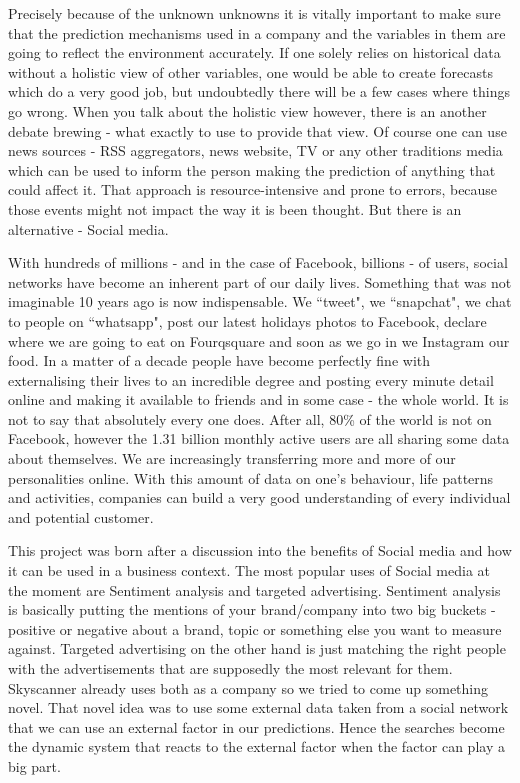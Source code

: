 \documentclass[minf,twoside,singlespacing,parskip,frontabs,notimes,12pt]{infthesis} %
\begin{document}
Precisely because of the unknown unknowns it is vitally important to make sure that the prediction mechanisms used in a company and the variables in them are going to reflect the environment accurately. 
If one solely relies on historical data without a holistic view of other variables, one would be able to create forecasts which do a very good job, but undoubtedly there will be a few cases where things go wrong. 
When you talk about the holistic view however, there is an another debate brewing - what exactly to use to provide that view. Of course one can use news sources - RSS aggregators, news website, TV or any other traditions media which can be used to inform the person making the prediction of anything that could affect it. 
That approach is resource-intensive and prone to errors, because those events might not impact the way it is been thought. But there is an alternative - Social media. 

With hundreds of millions - and in the case of Facebook, billions - of users, social networks have become an inherent part of our daily lives. Something that was not imaginable 10 years ago is now indispensable. 
We ``tweet", we ``snapchat", we chat to people on ``whatsapp", post our latest holidays photos to Facebook, declare where we are going to eat on Fourqsquare and soon as we go in we Instagram our food. 
In a matter of a decade people have become perfectly fine with externalising their lives to an incredible degree and posting every minute detail online and making it available to friends and in some case - the whole world. 
It is not to say that absolutely every one does. 
After all, 80\% of the world is not on Facebook\cite{FBstats}, however the 1.31 billion monthly active users are all sharing some data about themselves. 
We are increasingly transferring more and more of our personalities online.
 With this amount of data on one's behaviour, life patterns and activities, companies can build a very good understanding of every individual and potential customer.


This project was born after a discussion into the benefits of Social media and how it can be used in a business context. 
The most popular uses of Social media at the moment are Sentiment analysis and targeted advertising. 
Sentiment analysis is basically putting the mentions of your brand/company into two big buckets - positive or negative about a brand, topic or something else you want to measure against.
Targeted advertising on the other hand is just matching the right people with the advertisements that are supposedly the most relevant for them. 
Skyscanner already uses both as a company so we tried to come up something novel. 
That novel idea was to use some external data taken from a social network that we can use an external factor in our predictions. 
Hence the searches become the dynamic system that reacts to the external factor when the factor can play a big part. 
\end{document}
